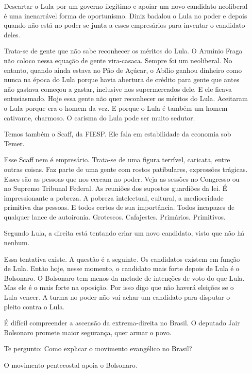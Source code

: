  Descartar o Lula por um governo ilegítimo e apoiar um novo candidato
neoliberal é uma inenarrável forma de oportunismo. Diniz badalou o Lula
no poder e depois quando não está no poder se junta a esses empresários
para inventar o candidato deles.

 Trata-se de gente que não sabe reconhecer os méritos do Lula. O
Armínio Fraga não coloco nessa equação de gente vira-casaca. Sempre foi
um neoliberal. No entanto, quando ainda estava no Pão de Açúcar, o
Abílio ganhou dinheiro como nunca na época do Lula porque havia abertura
de crédito para gente que antes não gastava começou a gastar, inclusive
nos supermercados dele. E ele ficava entusiasmado. Hoje essa gente não
quer reconhecer os méritos do Lula. Aceitaram o Lula porque era o homem
da vez. E porque o Lula é também um homem cativante, charmoso. O carisma
do Lula pode ser muito sedutor.

 Temos também o Scaff, da FIESP. Ele fala em estabilidade da economia
sob Temer.

 Esse Scaff nem é empresário. Trata-se de uma figura terrível,
caricata, entre outras coisas. Faz parte de uma gente com rostos
patibulares, expressões trágicas. Esses são as pessoas que nos cercam no
poder. Veja as sessões no Congresso ou no Supremo Tribunal Federal. As
reuniões dos supostos guardiões da lei. É impressionante a pobreza. A
pobreza intelectual, cultural, a mediocridade primitiva das pessoas. E
todos certos de sua importância. Todos incapazes de qualquer lance de
autoironia. Grotescos. Cafajestes. Primários. Primitivos.

 Segundo Lula, a direita está tentando criar um novo candidato, visto
que não há nenhum.

 Essa tentativa existe. A questão é a seguinte. Os candidatos existem
em função de Lula. Então hoje, nesse momento, o candidato mais forte
depois de Lula é o Bolsonaro. O Bolsonaro tem menos da metade de
intenções de voto do que Lula. Mas ele é o mais forte na oposição. Por
isso digo que não haverá eleições se o Lula vencer. A turma no poder não
vai achar um candidato para disputar o pleito contra o Lula.

 É difícil compreender a ascensão da extrema-direita no Brasil. O
deputado Jair Bolsonaro promete maior segurança, quer armar o povo.

 Te pergunto: Como explicar o movimento evangélico no Brasil?

 O movimento pentecostal apoia o Bolsonaro.

